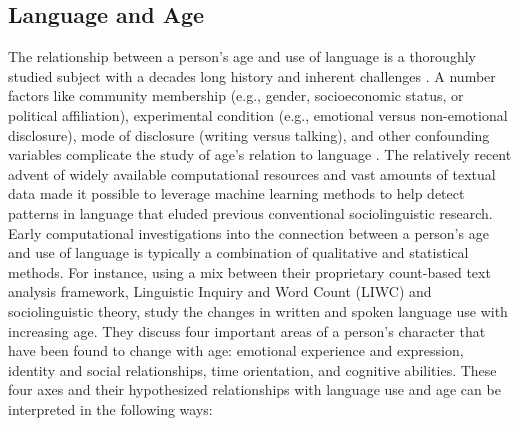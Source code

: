 \subsection{Language and Age}
The relationship between a person's age and use of language is a thoroughly studied subject with a decades long history and inherent challenges \citep{pennebaker2003words, nguyen2014gender, zheng2019personalized}. A number factors like community membership (e.g., gender, socioeconomic status, or political affiliation), experimental condition (e.g., emotional versus non-emotional disclosure), mode of disclosure (writing versus talking), and other confounding variables complicate the study of age's relation to language \citep{nguyen-etal-2011-author}. The relatively recent advent of widely available computational resources and vast amounts of textual data made it possible to leverage machine learning methods to help detect patterns in language that eluded previous conventional sociolinguistic research. Early computational investigations into the connection between a person's age and use of language is typically a combination of qualitative and statistical methods. For instance, using a mix between their proprietary count-based text analysis framework, Linguistic Inquiry and Word Count (LIWC) and sociolinguistic theory, \cite{pennebaker2003words} study the changes in written and spoken language use with increasing age. They discuss four important areas of a person's character that have been found to change with age: emotional experience and expression, identity and social relationships, time orientation, and cognitive abilities. These four axes and their hypothesized relationships with language use and age can be interpreted in the following ways:
